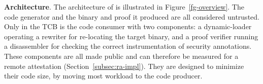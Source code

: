 



\vspace{3pt}\noindent\textbf{Architecture}. The architecture of is illustrated in Figure~\ref{fg-overview}. The code generator and the binary and proof it produced are all considered untrusted. Only in the TCB is the code consumer with two components: a dynamic-loader operating a rewriter for re-locating the target binary, and a proof verifier running a disassembler for checking the correct instrumentation of security annotations. These components are all made public and can therefore be measured for a remote attestation (Section~\ref{subsec:ra-impl}). They are designed to minimize their code size, by moving most workload to the code producer. 




